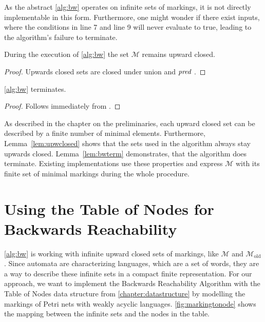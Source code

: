 As the abstract \autoref{alg:bw} operates on infinite sets of markings, it is not directly implementable in this form. Furthermore, one might wonder if there exist inputs, where the conditions in line 7 and line 9 will never evaluate to true, leading to the algorithm's failure to terminate.

\begin{lemma}\label{lem:upwclosed}
During the execution of \autoref{alg:bw} the set $\mathcal{M}$ remains upward closed. 
\end{lemma}
\begin{proof}
Upwards closed sets are closed under union and $\operatorname{\textit{pred}}$ {\cite[Lemma~3.2.16]{esparza_19}}. 
\end{proof}


\begin{lemma}\label{lem:bwterm}
\autoref{alg:bw} terminates. 
\end{lemma}
\begin{proof}
Follows immediately from {\cite[Lemma~3.2.17]{esparza_19}}.
\end{proof}

As described in the chapter on the preliminaries, each upward closed set can be described by a finite number of minimal elements. Furthermore, Lemma~\autoref{lem:upwclosed} shows that the sets used in the algorithm always stay upwards closed. Lemma~\autoref{lem:bwterm} demonstrates, that the algorithm does terminate. Existing implementations use these properties and express $\mathcal{M}$ with its finite set of minimal markings during the whole procedure.


\section{Using the Table of Nodes for Backwards Reachability}
\autoref{alg:bw} is working with infinite upward closed sets of markings, like $\mathcal{M}$ and $\mathcal{M}_{\text{old}}$. Since automata are characterizing languages, which are a set of words, they are a way to describe these infinite sets in a compact finite representation. For our approach, we want to implement the Backwards Reachability Algorithm with the Table of Nodes data structure from \autoref{chapter:datastructure} by modelling the markings of Petri nets with weakly acyclic languages. 
\autoref{fig:markingtonode} shows the mapping between the infinite sets and the nodes in the table. 
\par 

